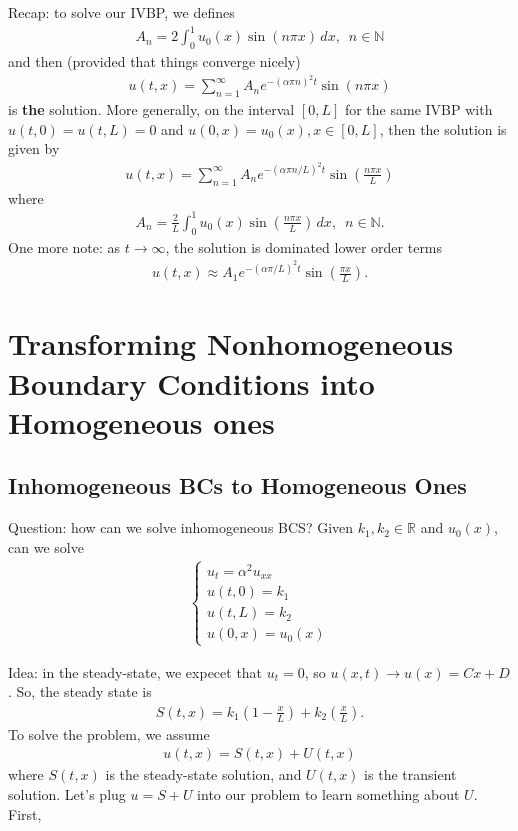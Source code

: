 \documentclass{book}
\theoremstyle{definition}
\newcommand{\R}{\mathbb{R}}
\begin{document}
Recap: to solve our IVBP, we defines 
\begin{align*}
A_n = 2\int_{0}^1 u_0(x)\sin(n\pi x)\,dx, \,\,\, n\in \mathbb{N}
\end{align*}
and then (provided that things converge nicely)
\begin{align*}
u(t,x) = \sum_{n=1}^\infty A_n e^{-(\alpha \pi n)^2 t}\sin(n\pi x)
\end{align*}
is \textbf{the} solution. More generally, on the interval $[0,L]$ for the same IVBP with $u(t,0) = u(t,L) = 0$ and $u(0,x) = u_0(x), x\in[0,L]$, then the solution is given by
\begin{align*}
u(t,x) = \sum_{n=1}^\infty A_n e^{-(\alpha \pi n/L)^2 t}\sin\left(\frac{n\pi x}{L}\right)
\end{align*}
where 
\begin{align*}
A_n = \frac{2}{L}\int_{0}^1 u_0(x)\sin\left(\frac{n\pi x}{L}\right)\,dx, \,\,\, n\in \mathbb{N}.
\end{align*}
One more note: as $t\to \infty$, the solution is dominated lower order terms
\begin{align*}
u(t,x)\approx A_1 e^{-(\alpha \pi/L)^2 t}\sin\left(\frac{\pi x}{L}\right).
\end{align*}





\newpage
\chapter{Transforming Nonhomogeneous Boundary Conditions into Homogeneous ones }

\section{Inhomogeneous BCs to Homogeneous Ones}

Question: how can we solve inhomogeneous BCS? Given $k_1,k_2\in\R$ and $u_0(x)$, can we solve
\begin{align*}
\begin{cases}
u_t = \alpha^2u_{xx}\\
u(t,0) = k_1\\
u(t,L) = k_2\\
u(0,x) = u_0(x)
\end{cases}
\end{align*}

Idea: in the steady-state, we expecet that $u_t = 0$, so $u(x,t) \to u(x) = Cx+D$. So, the steady state is
\begin{align*}
S(t,x) = k_1\left( 1 - \frac{x}{L} \right) + k_2\left(\frac{x}{L} \right).
\end{align*}
To solve the problem, we assume 
\begin{align*}
u(t,x) = S(t,x) + U(t,x)
\end{align*}
where $S(t,x)$ is the steady-state solution, and $U(t,x)$ is the transient solution. Let's plug $u = S+U$ into our problem to learn something about $U$. First, 
\end{document}

